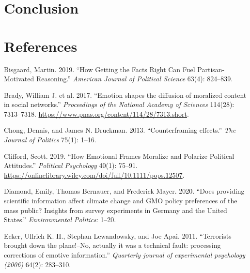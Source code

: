 \documentclass[
  12pt,
]{article}
\begin{document}
\hypertarget{conclusion}{%
\section{Conclusion}\label{conclusion}}

\newpage

\hypertarget{references}{%
\section{References}\label{references}}

\linespread{1}
\setlength{\parindent}{-0.2in}
\setlength{\leftskip}{0.2in}
\setlength{\parskip}{8pt}

\noindent

\hypertarget{refs}{}
\leavevmode\hypertarget{ref-bisgaard2019getting}{}%
Bisgaard, Martin. 2019. ``How Getting the Facts Right Can Fuel Partisan-Motivated Reasoning.'' \emph{American Journal of Political Science} 63(4): 824--839.

\leavevmode\hypertarget{ref-brady2017emotion}{}%
Brady, William J. et al. 2017. ``Emotion shapes the diffusion of moralized content in social networks.'' \emph{Proceedings of the National Academy of Sciences} 114(28): 7313--7318. \url{https://www.pnas.org/content/114/28/7313.short}.

\leavevmode\hypertarget{ref-chong2013counterframing}{}%
Chong, Dennis, and James N. Druckman. 2013. ``Counterframing effects.'' \emph{The Journal of Politics} 75(1): 1--16.

\leavevmode\hypertarget{ref-clifford2019emotional}{}%
Clifford, Scott. 2019. ``How Emotional Frames Moralize and Polarize Political Attitudes.'' \emph{Political Psychology} 40(1): 75--91. \url{https://onlinelibrary.wiley.com/doi/full/10.1111/pops.12507}.

\leavevmode\hypertarget{ref-diamond2020does}{}%
Diamond, Emily, Thomas Bernauer, and Frederick Mayer. 2020. ``Does providing scientific information affect climate change and GMO policy preferences of the mass public? Insights from survey experiments in Germany and the United States.'' \emph{Environmental Politics}: 1--20.

\leavevmode\hypertarget{ref-ecker2011terrorists}{}%
Ecker, Ullrich K. H., Stephan Lewandowsky, and Joe Apai. 2011. ``Terrorists brought down the plane!--No, actually it was a technical fault: processing corrections of emotive information.'' \emph{Quarterly journal of experimental psychology (2006)} 64(2): 283--310.
\end{document}
